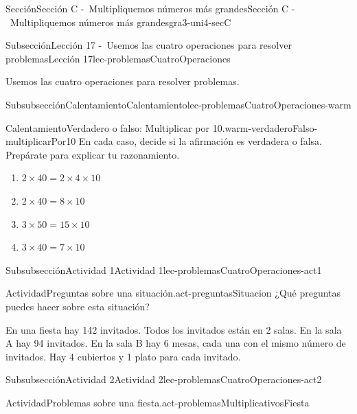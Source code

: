 \documentclass[twoside,10pt,]{article}
\begin{document}
\begin{sectionptx}{Sección}{Sección C -~Multipliquemos números más grandes}{}{Sección C -~Multipliquemos números más grandes}{}{}{gra3-uni4-secC}
\begin{subsectionptx}{Subsección}{Lección 17 -~Usemos las cuatro operaciones para resolver problemas}{}{Lección 17}{}{}{lec-problemasCuatroOperaciones}
\begin{introduction}{}%
Usemos las cuatro operaciones para resolver problemas.%
\end{introduction}%
%
%
\typeout{************************************************}
\typeout{************************************************}
%
\begin{subsubsectionptx}{Subsubsección}{Calentamiento}{}{Calentamiento}{}{}{lec-problemasCuatroOperaciones-warm}
\begin{exploration}{Calentamiento}{Verdadero o falso: Multiplicar por 10.}{warm-verdaderoFalso-multiplicarPor10}%
En cada caso, decide si la afirmación es verdadera o falsa. Prepárate para explicar tu razonamiento.%
%
\begin{enumerate}[label={\Alph*.}]
\item{}\(\displaystyle 2 \times 40 = 2 \times 4 \times 10\)%
\item{}\(\displaystyle 2 \times 40 = 8 \times 10\)%
\item{}\(\displaystyle 3 \times 50 = 15 \times 10\)%
\item{}\(\displaystyle 3 \times 40 = 7 \times 10\)%
\end{enumerate}
\end{exploration}%
\end{subsubsectionptx}
%
%
\typeout{************************************************}
\typeout{************************************************}
%
\begin{subsubsectionptx}{Subsubsección}{Actividad 1}{}{Actividad 1}{}{}{lec-problemasCuatroOperaciones-act1}
\begin{activity}{Actividad}{Preguntas sobre una situación.}{act-preguntasSituacion}%
¿Qué preguntas puedes hacer sobre esta situación?%
\par
En una fiesta hay 142 invitados. Todos los invitados están en 2 salas. En la sala A hay 94 invitados. En la sala B hay 6 mesas, cada una con el mismo número de invitados. Hay 4 cubiertos y 1 plato para cada invitado.%
\end{activity}%
\end{subsubsectionptx}
%
%
\typeout{************************************************}
\typeout{************************************************}
%
\begin{subsubsectionptx}{Subsubsección}{Actividad 2}{}{Actividad 2}{}{}{lec-problemasCuatroOperaciones-act2}
\begin{activity}{Actividad}{Problemas sobre una fiesta.}{act-problemasMultiplicativosFiesta}%

\end{activity}
\end{subsubsectionptx}
\end{subsectionptx}
\end{sectionptx}
\end{document}
